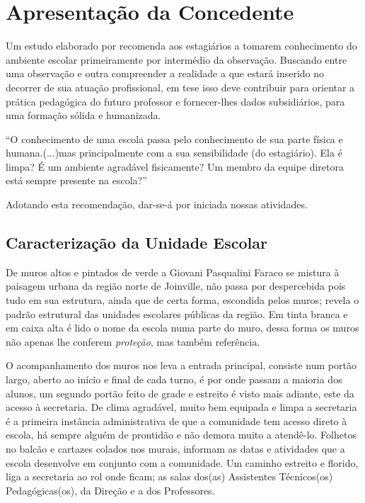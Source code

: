 \chapter{Apresentação da Concedente}
\label{cap: aprConcedente}

Um estudo elaborado por \cite{CARVALHOAMP:2012a} recomenda aos estagiários a tomarem conhecimento do ambiente escolar primeiramente por intermédio da observação. Buscando entre uma observação e outra compreender a realidade a que estará inserido no decorrer de sua atuação profissional, em tese isso deve contribuir para orientar a prática pedagógica do futuro professor e fornecer-lhes dados subsidiários, para uma formação sólida e humanizada.
\begin{citacao}
``O conhecimento de uma escola passa pelo conhecimento de sua parte física e humana.(...)mas principalmente com a sua sensibilidade (do estagiário). Ela é limpa? É um ambiente agradável fisicamente? Um membro da equipe diretora está sempre presente na escola?'' 
\end{citacao}
Adotando esta recomendação, dar-se-á por iniciada nossas atividades.

\section{Caracterização da Unidade Escolar}
De muros altos e pintados de verde a Giovani Pasqualini Faraco se mistura à paisagem urbana da região norte de Joinville, não passa por despercebida pois tudo em sua estrutura, ainda que de certa forma, escondida pelos muros; revela o padrão estrutural das unidades escolares públicas da região. Em tinta branca e em caixa alta é lido o nome da escola numa parte do muro, dessa forma os muros não apenas lhe conferem \emph{proteção}, mas também referência.

O acompanhamento dos muros nos leva a entrada principal, consiste num portão largo, aberto ao início e final de cada turno, é por onde passam a maioria dos alunos, um segundo portão feito de grade e estreito é visto mais adiante, este da acesso à secretaria. De clima agradável, muito bem equipada e limpa a secretaria é a primeira instância administrativa de que a comunidade tem acesso direto à escola, há sempre alguém de prontidão e não demora muito a atendê-lo. Folhetos no balcão e cartazes colados nos murais, informam as datas e atividades que a escola desenvolve em conjunto com a comunidade. Um caminho estreito e florido, liga a secretaria ao rol onde ficam; as salas dos(as) Assistentes Técnicos(os) Pedagógicas(os), da Direção e a dos Professores.

